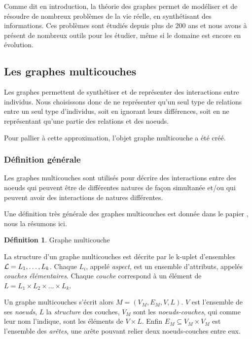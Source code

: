 \documentclass[11pt,a4paper]{article}
\theoremstyle{definition}
\newtheorem{defn}{Définition}
\theoremstyle{remark}
\theoremstyle{remark}
\begin{document}
Comme dit en introduction, la théorie des graphes permet de modéliser et de résoudre de nombreux problèmes de la vie réelle, en synthétisant des informations. Ces problèmes sont étudiés depuis plus de 200 ans et nous avons à présent de nombreux outils pour les étudier, même si le domaine est encore en évolution.

\subsection{Les graphes multicouches}

Les graphes permettent de synthétiser et de représenter des interactions entre individus. Nous choisissons donc de ne représenter qu'un seul type de relations entre un seul type d'individus, soit en ignorant leurs différences, soit en ne représentant qu'une partie des relations et des noeuds. 

Pour pallier à cette \og approximation\fg{}, l'objet graphe multicouche a été créé.

\subsubsection{Définition générale}

 Les graphes multicouches sont utilisés pour décrire des interactions entre des noeuds qui peuvent être de différentes natures de façon simultanée et/ou qui peuvent avoir des interactions de natures différentes. 
 
 Une définition très générale des graphes multicouches est donnée dans le papier \cite{mlkiv}, nous la résumons ici.
 
 \begin{defn}{Graphe multicouche}
 
 La structure d'un graphe multicouches est décrite par le k-uplet d'ensembles ${\cal L} = L_1, \dots , L_k$. Chaque $L_i$, appelé {\em aspect}, est un ensemble d'attributs, appelés {\em couches élémentaires}. Chaque {\em couche} correspond à un élément de $L=L_1\times L_2 \times \dots \times L_k$.
 
 Un graphe multicouches s'écrit alors $M = (V_M, E_M, V, L)$. $V$ est l'ensemble de ses {\em noeuds}, $L$ la {\em structure} des couches, $V_M$ sont les {\em noeuds-couches}, qui comme leur nom l'indique, sont les éléments de $V\times L$. Enfin $E_M \subseteq V_M \times V_M $ est l'ensemble des {\em arêtes}, une arête pouvant relier deux noeuds-couches entre eux. 

	\end{defn}
 
\end{document}
